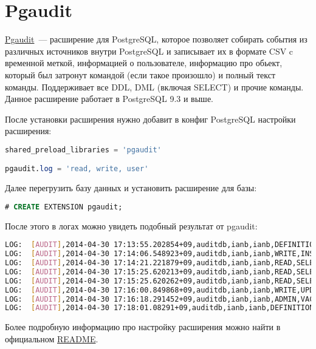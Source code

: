 \section{Pgaudit}

\href{https://github.com/2ndQuadrant/pgaudit}{Pgaudit}~--- расширение для PostgreSQL, которое позволяет собирать события из различных источников внутри PostgreSQL и записывает их в формате CSV c временной меткой, информацией о пользователе, информацию про обьект, который был затронут командой (если такое произошло) и полный текст команды. Поддерживает все DDL, DML (включая SELECT) и прочие команды. Данное расширение работает в PostgreSQL 9.3 и выше.

После установки расширения нужно добавит в конфиг PostgreSQL настройки расширения:

\begin{lstlisting}[language=SQL,label=lst:pgaudit1,caption=Pgaudit]
shared_preload_libraries = 'pgaudit'

pgaudit.log = 'read, write, user'
\end{lstlisting}

Далее перегрузить базу данных и установить расширение для базы:

\begin{lstlisting}[language=SQL,label=lst:pgaudit2,caption=Pgaudit]
# CREATE EXTENSION pgaudit;
\end{lstlisting}

После этого в логах можно увидеть подобный результат от pgaudit:

\begin{lstlisting}[language=Bash,label=lst:pgaudit3,caption=Pgaudit]
LOG:  [AUDIT],2014-04-30 17:13:55.202854+09,auditdb,ianb,ianb,DEFINITION,CREATE TABLE,TABLE,public.x,CREATE  TABLE  public.x (a pg_catalog.int4   , b pg_catalog.int4   )   WITH (oids=OFF)
LOG:  [AUDIT],2014-04-30 17:14:06.548923+09,auditdb,ianb,ianb,WRITE,INSERT,TABLE,public.x,INSERT INTO x VALUES(1,1);
LOG:  [AUDIT],2014-04-30 17:14:21.221879+09,auditdb,ianb,ianb,READ,SELECT,TABLE,public.x,SELECT * FROM x;
LOG:  [AUDIT],2014-04-30 17:15:25.620213+09,auditdb,ianb,ianb,READ,SELECT,VIEW,public.v_x,SELECT * from v_x;
LOG:  [AUDIT],2014-04-30 17:15:25.620262+09,auditdb,ianb,ianb,READ,SELECT,TABLE,public.x,SELECT * from v_x;
LOG:  [AUDIT],2014-04-30 17:16:00.849868+09,auditdb,ianb,ianb,WRITE,UPDATE,TABLE,public.x,UPDATE x SET a=a+1;
LOG:  [AUDIT],2014-04-30 17:16:18.291452+09,auditdb,ianb,ianb,ADMIN,VACUUM,,,VACUUM x;
LOG:  [AUDIT],2014-04-30 17:18:01.08291+09,auditdb,ianb,ianb,DEFINITION,CREATE FUNCTION,FUNCTION,public.func_x(),CREATE  FUNCTION public.func_x() RETURNS  pg_catalog.int4 LANGUAGE sql  VOLATILE  CALLED ON NULL INPUT SECURITY INVOKER COST 100.000000   AS $dprs_$SELECT a FROM x LIMIT 1;$dprs_$
\end{lstlisting}

Более подробную информацию про настройку расширения можно найти в официальном \href{https://github.com/2ndQuadrant/pgaudit#configuration}{README}.
